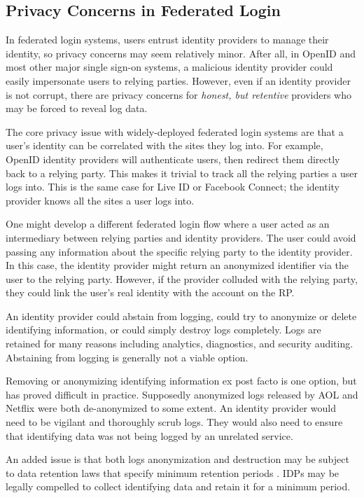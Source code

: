 \documentclass{llncs}
\begin{document}
\subsection{Privacy Concerns in Federated Login}

In federated login systems, users entrust identity providers to manage their
identity, so privacy concerns may seem relatively minor. After all, in OpenID
and most other major single sign-on systems, a malicious identity provider could
easily impersonate users to relying parties. However, even if an identity
provider is not corrupt, there are privacy concerns for
\emph{honest, but retentive} providers who may be forced to reveal log data.

The core privacy issue with widely-deployed federated login systems are that
a user's identity can be correlated with the sites they log into. For example,
OpenID identity providers will authenticate users, then redirect them directly
back to a relying party. This makes it trivial to track all the relying parties
a user logs into. This is the same case for Live ID or Facebook Connect; the
identity provider knows all the sites a user logs into.

One might develop a different federated login flow where a user acted as an
intermediary between relying parties and identity providers. The user could
avoid passing any information about the specific relying party to the identity
provider. In this case, the identity provider might return an anonymized
identifier via the user to the relying party. However, if the provider colluded
with the relying party, they could link the user's real identity with the
account on the RP.

An identity provider could abstain from logging, could try to
anonymize or delete identifying information, or could simply destroy
logs completely. Logs are retained for many reasons including
analytics, diagnostics, and security auditing. Abstaining from logging
is generally not a viable option. 

Removing or anonymizing identifying information ex post facto is one
option, but has proved difficult in practice. Supposedly anonymized
logs released by AOL \cite{BarZel06} and Netflix \cite{NaSh08} were
both de-anonymized to some extent. An identity provider would need to
be vigilant and thoroughly scrub logs. They would also need to ensure
that identifying data was not being logged by an unrelated service. 

An added issue is that both logs anonymization and destruction 
may be subject to data retention laws that specify minimum retention
periods \cite{EUDir}. IDPs may be legally compelled to collect
identifying data and retain it for a minimum period.
\end{document}
